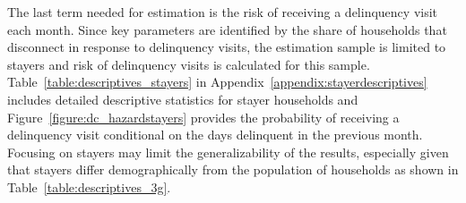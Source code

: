 \documentclass[12pt]{article}
\begin{document}
\begin{table}[H]
\centering
\caption{Calibrated and Assumed Parameters}\label{table:calibratedparam}
\vspace{-2mm}
\end{table}

The last term needed for estimation is the risk of receiving a delinquency visit each month.  Since key parameters are identified by the share of households that disconnect in response to delinquency visits, the estimation sample is limited to stayers and risk of delinquency visits is calculated for this sample.  Table~\ref{table:descriptives_stayers} in Appendix~\ref{appendix:stayerdescriptives} includes detailed descriptive statistics for stayer households and Figure~\ref{figure:dc_hazardstayers} provides the probability of receiving a delinquency visit conditional on the days delinquent in the previous month.  Focusing on stayers may limit the generalizability of the results, especially given that stayers differ demographically from the population of households as shown in Table~\ref{table:descriptives_3g}.   %
\end{document}
